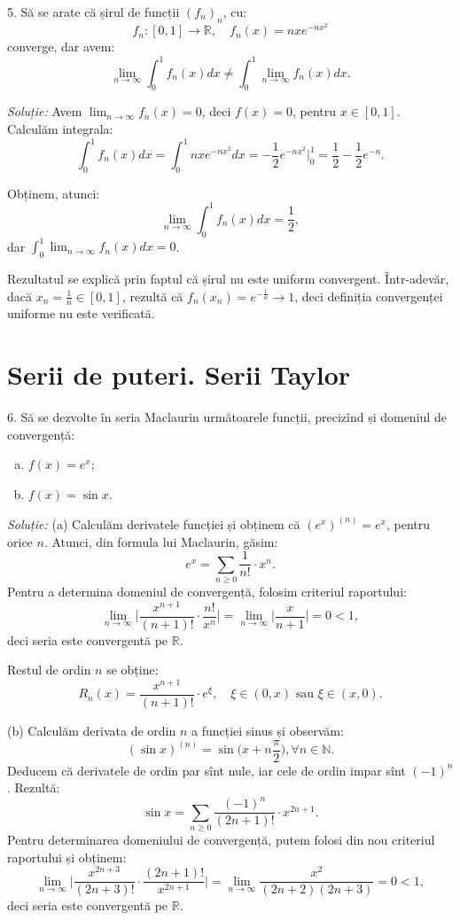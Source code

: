 \documentclass[11pt,a4paper]{article}
\newcommand\ds{\displaystyle}
\newcommand\NN{\mathbb{N}}
\newcommand\RR{\mathbb{R}}
\theoremstyle{dotless}
\theoremstyle{dotlessdr}
\begin{document}
5. Să se arate că șirul de funcții $(f_n)_n$, cu:
\[
  f_n : [0, 1] \to \RR, \quad f_n(x) = nxe^{-nx^2}
\]
converge, dar avem:
\[
  \lim_{n \to \infty} \int_0^1 f_n(x) dx \neq \int_0^1 \lim_{n \to \infty} f_n(x) dx.
\]

\emph{Soluție:} Avem $\ds\lim_{n \to \infty}f_n(x) = 0$, deci $f(x) = 0$, pentru
$x \in [0, 1]$. Calculăm integrala:
\[
  \int_0^1 f_n(x) dx = \int_0^1 nxe^{-nx^2} dx = -\frac{1}{2} e^{-nx^2}\Big|_0^1 = %
  \frac{1}{2} - \frac{1}{2} e^{-n}.
\]

Obținem, atunci:
\[
  \lim_{n \to \infty} \int_0^1 f_n(x) dx = \frac{1}{2},
\]
dar $\ds\int_0^1 \lim_{n \to \infty} f_n(x) dx = 0$.

Rezultatul se explică prin faptul că șirul nu este uniform convergent. Într-adevăr,
dacă $x_n = \frac{1}{n} \in [0, 1]$, rezultă că $f_n(x_n) = e^{-\frac{1}{n}} \to 1$,
deci definiția convergenței uniforme nu este verificată.


\section{Serii de puteri. Serii Taylor}
\label{sec:taylor}

6. Să se dezvolte în seria Maclaurin următoarele funcții, precizînd și
domeniul de convergență:
\begin{enumerate}[(a)]
\item $f(x) = e^x$;
\item $f(x) = \sin x$.
\end{enumerate}

\emph{Soluție:} (a) Calculăm derivatele funcției și obținem că $(e^x)^{(n)} = e^x$,
pentru orice $n$. Atunci, din formula lui Maclaurin, găsim:
\[
  e^x = \sum_{n \geq 0} \frac{1}{n!} \cdot x^n.
\]
Pentru a determina domeniul de convergență, folosim criteriul raportului:
\[
  \lim_{n \to \infty} \Big| \frac{x^{n+1}}{(n+1)!} \cdot \frac{n!}{x^n} \Big| = %
  \lim_{n \to \infty} \Big| \frac{x}{n+1} \Big| = 0 < 1,
\]
deci seria este convergentă pe $\RR$.

Restul de ordin $n$ se obține:
\[
  R_n(x) = \frac{x^{n + 1}}{(n + 1)!} \cdot e^{\xi}, \quad \xi \in (0, x) \text{ sau } %
  \xi \in (x, 0).
\]

(b) Calculăm derivata de ordin $n$ a funcției sinus și observăm:
\[
  (\sin x)^{(n)} = \sin \Big( x + n \frac{\pi}{2} \Big), \forall n \in \NN.
\]
Deducem că derivatele de ordin par sînt nule, iar cele de ordin impar sînt $(-1)^n$.
Rezultă:
\[
  \sin x = \sum_{n \geq 0} \frac{(-1)^n}{(2n + 1)!} \cdot x^{2n + 1}.
\]
Pentru determinarea domeniului de convergență, putem folosi din nou criteriul
raportului și obținem:
\[
  \lim_{n \to \infty} \Big| \frac{x^{2n + 3}}{(2n + 3)!} \cdot \frac{(2n + 1)!}{x^{2n + 1}} \Big| = %
  \lim_{n \to \infty} \frac{x^2}{(2n + 2)(2n + 3)} = 0 < 1,
\]
deci seria este convergentă pe $\RR$.
\end{document}

